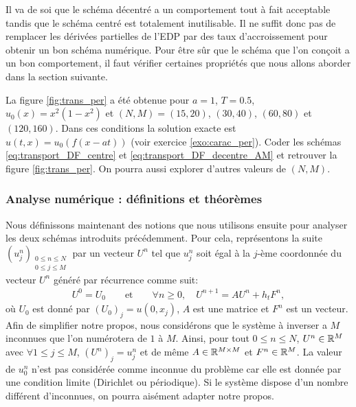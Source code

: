\documentclass[12pt,a4paper,twoside]{article}
\begin{document}
Il va de soi que le sch\'ema d\'ecentr\'e a un comportement tout \`a fait acceptable
tandis que le sch\'ema centr\'e est totalement inutilisable.
Il ne suffit donc pas de remplacer les d\'eriv\'ees
partielles de l'EDP par des taux d'accroissement pour obtenir un bon sch\'ema num\'erique.
Pour \^etre s\^ur que le sch\'ema que l'on con\c{c}oit a un bon comportement,
il faut v\'erifier certaines propri\'et\'es que nous allons aborder dans la section suivante.


\begin{exercise}
  La figure \ref{fig:trans_per} a \'et\'e obtenue pour $a=1$, $T=0.5$, $u_0(x) = x^2(1-x^2)$
  et $(N,M) = (15,20)$, $(30,40)$, $(60,80)$ et $(120,160)$.
  Dans ces conditions la solution exacte est $u(t,x) = u_0(f(x-at))$
  (voir exercice \ref{exo:carac_per}).
  Coder les sch\'emas \eqref{eq:transport_DF_centre} et \eqref{eq:transport_DF_decentre_AM}
  et retrouver la figure \ref{fig:trans_per}.
  On pourra aussi explorer d'autres valeurs de $(N,M)$.
\end{exercise}

\subsubsection{Analyse num\'erique : d\'efinitions et th\'eor\`emes}
\label{subsubsec:analyse_def}

Nous d\'efinissons maintenant des notions que nous
utilisons ensuite pour analyser les deux sch\'emas introduits pr\'ec\'edemment.
Pour cela, repr\'esentons la suite $(u_j^n)_{\substack{0 \leq n \leq N \\ 0 \leq j \leq M}}$
par un vecteur $U^n$
tel que $u_j^n$ soit \'egal \`a la $j$-\`eme coordonn\'ee du vecteur
$U^n$ g\'en\'er\'e par r\'ecurrence comme suit:
\begin{align}
  \label{eq:schema_1pas}
  U^0 = U_0 \qquad \text{et} \qquad \forall n \geq 0, \quad U^{n+1} = A U^n + h_t F^n ,
\end{align}
o\`u $U_0$ est donn\'e par $(U_0)_j = u(0,x_j)$, $A$ est une matrice
et $F^n$ est un vecteur.
Afin de simplifier notre propos, nous consid\'erons que le syst\`eme \`a inverser 
a $M$ inconnues que l'on num\'erotera de $1$ \`a $M$.
Ainsi, pour tout $0 \leq n \leq N$,
$U^n \in \mathbb{R}^M$ avec $\forall 1 \leq j \leq M$, $(U^n)_j = u_j^n$ et de m\^eme
$A \in \mathbb{R}^{M \times M}$ et $F^n \in \mathbb{R}^M$.
La valeur de $u_0^n$ n'est pas consid\'er\'ee comme inconnue du probl\`eme
car elle est donn\'ee par une condition limite (Dirichlet ou p\'eriodique).
Si le syst\`eme dispose d'un nombre diff\'erent d'inconnues, on pourra
ais\'ement adapter notre propos.
\end{document}
